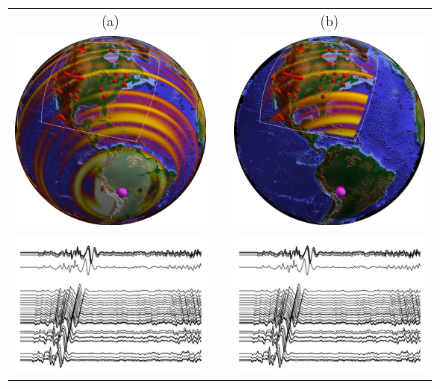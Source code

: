 \documentclass[12pt]{article}
\begin{document}
	\begin{figure}
		\begin{tabular}{ccc}
			(a)&&(b)\\
			\includegraphics[width=.4\textwidth]{figures/snap_glob.pdf} && \includegraphics[width=.4\textwidth]{figures/snap_reg.pdf} \\ 
			\includegraphics[width=.4\textwidth]{figures/seismo.pdf}    && \includegraphics[width=.4\textwidth]{figures/seismo.pdf}
		\end{tabular}


\end{figure}
\end{document}
